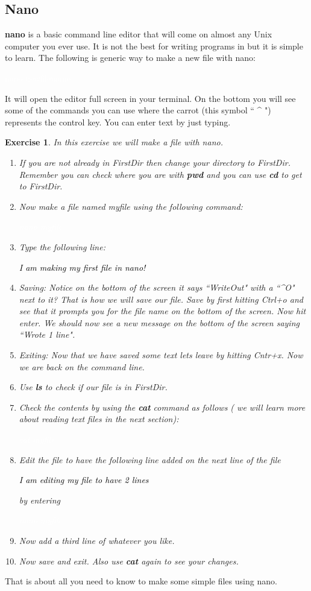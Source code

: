 \documentclass[oneside]{book}
\newcommand{\commandline}[1]{\begin{center} \colorbox{Dark}{\textcolor{white}{#1}} \end{center}}
\newcommand{\exampleout}[1]{\begin{center} \colorbox{Light}{\textcolor{black}{#1}} \end{center}}
\newtheorem{ex}{Exercise}[chapter]
\begin{document}
\subsection{Nano}
\textbf{nano} is a basic command line editor that will come on almost any Unix computer you ever use. It is not the best for writing programs in but it is simple to learn. The following is generic way to make a new file with nano:
\commandline{nano newfilename}
It will open the editor full screen in your terminal. On the bottom you will see some of the commands you can use where the carrot (this symbol `` \^{}  ") represents the control key. You can enter text by just typing.
\begin{ex} 
	In this exercise we will make a file with nano. \\
	\begin{enumerate} 
		\item If you are not already in FirstDir then change your directory to FirstDir. Remember you can check where you are with \textbf{pwd} and you can use \textbf{cd} to get to FirstDir.
		\item Now make a file named myfile using the following command:
			\commandline{nano myfile}
		\item Type the following line:
			\exampleout{I am making my first file in nano!}
		\item Saving: Notice on the bottom of the screen it says ``WriteOut" with a ``\^{}O" next to it? That is how we will save our file. Save by first hitting Ctrl+o and see that it prompts you for the file name on the bottom of the screen. Now hit enter. We should now see a new message on the bottom of the screen saying ``Wrote 1 line".
		\item Exiting: Now that we have saved some text lets leave by hitting Cntr+x. Now we are back on the command line.
		\item Use \textbf{ls} to check if our file is in FirstDir. 
		\item Check the contents by using the \textbf{cat} command as follows ( we will learn more about reading text files in the next section):
			\commandline{cat myfile}
		\item Edit the file to have the following line added on the next line of the file
			\exampleout{I am editing my file to have 2 lines}
			by entering
			\commandline{nano myfile}
		\item Now add a third line of whatever you like.
		\item Now save and exit. Also use \textbf{cat} again to see your changes.
	\end{enumerate}
\end{ex}
That is about all you need to know to make some simple files using nano.
\end{document}
